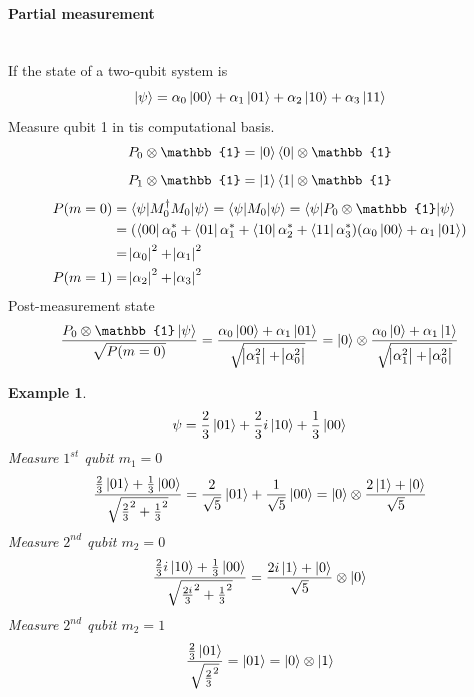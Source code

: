 \documentclass[]{article}
\newtheorem*{example}{Example}
\theoremstyle{nonumberplain}
\begin{document}
\paragraph{Partial measurement}%
\label{par:partial_measurement}\ \\
If the state of a two-qubit system is
\[
\ket{\psi}=\alpha_{0}\ket{00}+\alpha_{1}\ket{01}+\alpha_{2}\ket{10}+\alpha_{3}\ket{11}
\] 
Measure qubit 1 in tis computational basis.
\[
	P_{0}\otimes  \mathbb{1} = \ket{0}\bra{0}\otimes \mathbb{1}
\] 
\[
	P_{1}\otimes \mathbb{1} = \ket{1}\bra{1}\otimes \mathbb{1}
\] 
\begin{equation*}
\begin{aligned}
	P(m=0) &= \braket{\psi|M_{0}^{\dagger}M_{0}|\psi} = \braket{\psi|M_{0}|\psi} = \braket{\psi|P_{0}\otimes \mathbb{1}|\psi } \\
			 &=(\bra{00}\alpha_{0}^{*}+\bra{01}\alpha_{1}^{*}+\bra{10}\alpha_{2}^{*}+\bra{11}\alpha_{3}^{*})(\alpha_{0}\ket{00}+\alpha_{1}\ket{01})\\
			 &= \abs{\alpha_{0}}^{2}+\abs{\alpha_{1}}^{2} \\
	P(m=1) &= \abs{\alpha_{2}}^{2}+\abs{\alpha_{3}}^{2}
\end{aligned}
\end{equation*}
Post-measurement state
\[
	\frac{P_{0}\otimes\mathbb{1}\ket{\psi}}{\sqrt{P(m=0)}} = \frac{\alpha_{0}\ket{00}+\alpha_{1}\ket{01}}{\sqrt{\abs{\alpha_{1}^{2}}+\abs{\alpha_{0}^{2}}}} = \ket{0}\otimes\frac{\alpha_{0}\ket{0}+\alpha_{1}\ket{1}}{\sqrt{\abs{\alpha_{1}^{2}}+\abs{\alpha_{0}^{2}}}} 
\] 
\begin{example}
\[
\psi = \frac{2}{3}\ket{01}+\frac{2}{3}i\ket{10}+\frac{1}{3}\ket{00}
\] 
Measure $1^{st}$ qubit $m_{1}=0$ 
\[
\frac{\frac{2}{3}\ket{01}+\frac{1}{3}\ket{00}}{\sqrt{\frac{2}{3}^{2}+\frac{1}{3}^{2}}} = \frac{2}{\sqrt{5}}\ket{01}+\frac{1}{\sqrt{5}}\ket{00} = \ket{0}\otimes \frac{2\ket{1}+\ket{0}}{\sqrt{5}}
\] 
Measure $2^{nd}$ qubit $m_{2}=0$
\[
\frac{\frac{2}{3}i\ket{10}+\frac{1}{3}\ket{00}}{\sqrt{\frac{2i}{3}^{2}+\frac{1}{3}^{2}}}= \frac{2i\ket{1}+\ket{0}}{\sqrt{5}}\otimes \ket{0}
\] 
Measure $2^{nd}$ qubit $m_{2}=1$
\[
	\frac{\frac{2}{3}\ket{01}}{\sqrt{\frac{2}{3}^{2}}}=\ket{01}=\ket{0}\otimes\ket{1} 
\] 
\end{example}
\end{document}
